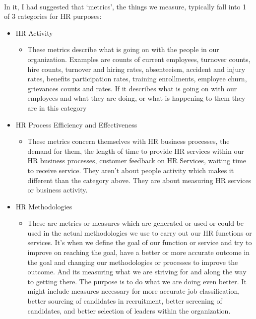 \documentclass[
]{article}
\providecommand{\tightlist}{%
  \setlength{\itemsep}{0pt}\setlength{\parskip}{0pt}}
\begin{document}
~

In it, I had suggested that `metrics', the things we measure, typically
fall into 1 of 3 categories for HR purposes:

\begin{itemize}
\item
  HR Activity

  \begin{itemize}
  \tightlist
  \item
    These metrics describe what is going on with the people in our
    organization. Examples are counts of current employees, turnover
    counts, hire counts, turnover and hiring rates, absenteeism,
    accident and injury rates, benefits participation rates, training
    enrollments, employee churn, grievances counts and rates. If it
    describes what is going on with our employees and what they are
    doing, or what is happening to them they are in this category
  \end{itemize}
\item
  HR Process Efficiency and Effectiveness

  \begin{itemize}
  \tightlist
  \item
    These metrics concern themselves with HR business processes, the
    demand for them, the length of time to provide HR services within
    our HR business processes, customer feedback on HR Services, waiting
    time to receive service. They aren't about people activity which
    makes it different than the category above. They are about measuring
    HR services or business activity.
  \end{itemize}
\item
  HR Methodologies

  \begin{itemize}
  \tightlist
  \item
    These are metrics or measures which are generated or used or could
    be used in the actual methodologies we use to carry out our HR
    functions or services. It's when we define the goal of our function
    or service and try to improve on reaching the goal, have a better or
    more accurate outcome in the goal and changing our methodologies or
    processes to improve the outcome. And its measuring what we are
    striving for and along the way to getting there. The purpose is to
    do what we are doing even better. It might include measures
    necessary for more accurate job classification, better sourcing of
    candidates in recruitment, better screening of candidates, and
    better selection of leaders within the organization.
  \end{itemize}
\end{itemize}
\end{document}
